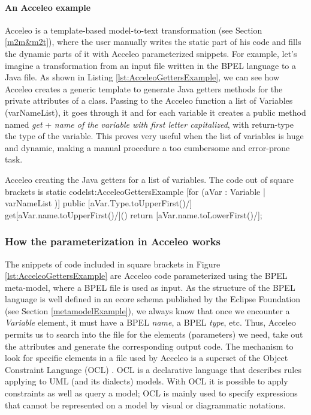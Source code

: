 \paragraph{An Acceleo example}
Acceleo is a template-based model-to-text transformation (see Section \ref{m2m&m2t}), where the user manually writes the static part of his code and fills the dynamic parts of it with Acceleo parameterized snippets.
For example, let's imagine a transformation from an input file written in the BPEL language to a Java file. As shown in Listing \ref{lst:AcceleoGettersExample}, we can see how Acceleo creates a generic template to generate Java getters methods for the private attributes of a class. Passing to the Acceleo function a list of Variables (varNameList), it goes through it and for each variable it creates a public method named \textit{get} + \textit{name of the variable with first letter capitalized}, with return-type the type of the variable. This proves very useful when the list of variables is huge and dynamic, making a manual procedure a too cumbersome and error-prone task.

\begin{workflow-code}{Acceleo creating the Java getters for a list of variables. The code out of square brackets is static code}{lst:AcceleoGettersExample}
[for (aVar : Variable | varNameList )]
public [aVar.Type.toUpperFirst()/] get[aVar.name.toUpperFirst()/]() {
	return [aVar.name.toLowerFirst()/];
}
\end{workflow-code}

\subsubsection{How the parameterization in Acceleo works}
\label{AcceleoParametirazion}
The snippets of code included in square brackets in Figure \ref{lst:AcceleoGettersExample} are Acceleo code parameterized using the BPEL meta-model, where a BPEL file is used as input. As the structure of the BPEL language is well defined in an ecore schema published by the Eclipse Foundation (see Section \ref{metamodelExample}), we always know that once we encounter a \textit{Variable} element, it must have a BPEL \textit{name}, a BPEL \textit{type}, etc. 
Thus, Acceleo permits us to search into the file for the elements (parameters) we need, take out the attributes and generate the corresponding output code.
The mechanism to look for specific elements in a file used by Acceleo is a superset of the Object Constraint Language (OCL) \cite{UML20OCL}. OCL is a declarative language that describes rules applying to UML (and its dialects) models. With OCL it is possible to apply constraints as well as query a model; OCL is mainly used to specify expressions that cannot be represented on a model by visual or diagrammatic notations.

